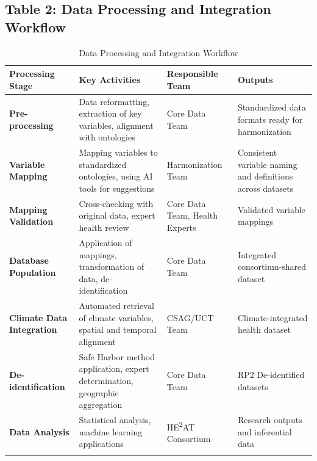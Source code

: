 \documentclass[12pt,a4paper,landscape]{article}
\begin{document}
\subsection*{Table 2: Data Processing and Integration Workflow}
\begin{longtable}{p{4cm}p{7cm}p{4cm}p{4.5cm}}
\toprule
\textbf{Processing Stage} & \textbf{Key Activities} & \textbf{Responsible Team} & \textbf{Outputs} \\
\midrule
\endhead

\textbf{Pre-processing} 
& Data reformatting, extraction of key variables, alignment with ontologies 
& Core Data Team 
& Standardized data formats ready for harmonization \\
\midrule

\textbf{Variable Mapping} 
& Mapping variables to standardized ontologies, using AI tools for suggestions 
& Harmonization Team 
& Consistent variable naming and definitions across datasets \\
\midrule

\textbf{Mapping Validation} 
& Cross-checking with original data, expert health review 
& Core Data Team, Health Experts 
& Validated variable mappings \\
\midrule

\textbf{Database Population} 
& Application of mappings, transformation of data, de-identification 
& Core Data Team 
& Integrated consortium-shared dataset \\
\midrule

\textbf{Climate Data Integration} 
& Automated retrieval of climate variables, spatial and temporal alignment 
& CSAG/UCT Team 
& Climate-integrated health dataset \\
\midrule

\textbf{De-identification} 
& Safe Harbor method application, expert determination, geographic aggregation 
& Core Data Team 
& RP2 De-identified datasets \\
\midrule

\textbf{Data Analysis} 
& Statistical analysis, machine learning applications 
& HE\textsuperscript{2}AT Consortium 
& Research outputs and inferential data \\
\bottomrule
\caption{Data Processing and Integration Workflow}
\end{longtable}
\clearpage
\end{document}
